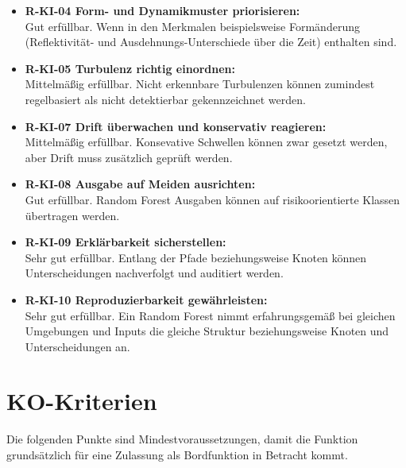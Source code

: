 \begin{itemize}
  \item \textbf{R-KI-04 Form- und Dynamikmuster priorisieren:}\\
  Gut erfüllbar. Wenn in den Merkmalen beispielsweise Formänderung (Reflektivität- und Ausdehnungs-Unterschiede über die Zeit) enthalten sind.

  \item \textbf{R-KI-05 Turbulenz richtig einordnen:}\\
  Mittelmäßig erfüllbar. Nicht erkennbare Turbulenzen können zumindest regelbasiert als nicht detektierbar gekennzeichnet werden.

  \item \textbf{R-KI-07 Drift überwachen und konservativ reagieren:}\\
  Mittelmäßig erfüllbar. Konsevative Schwellen können zwar gesetzt werden, aber Drift muss zusätzlich geprüft werden.

  \item \textbf{R-KI-08 Ausgabe auf Meiden ausrichten:}\\
  Gut erfüllbar. Random Forest Ausgaben können auf risikoorientierte Klassen übertragen werden.

  \item \textbf{R-KI-09 Erklärbarkeit sicherstellen:}\\
  Sehr gut erfüllbar. Entlang der Pfade beziehungsweise Knoten können Unterscheidungen nachverfolgt und auditiert werden.

  \item \textbf{R-KI-10 Reproduzierbarkeit gewährleisten:}\\
  Sehr gut erfüllbar. Ein Random Forest nimmt erfahrungsgemäß bei gleichen Umgebungen und Inputs die gleiche Struktur beziehungsweise Knoten und Unterscheidungen an.
\end{itemize}

\section{KO-Kriterien}
Die folgenden Punkte sind Mindestvoraussetzungen, damit die Funktion grundsätzlich für eine Zulassung
als Bordfunktion in Betracht kommt. 

